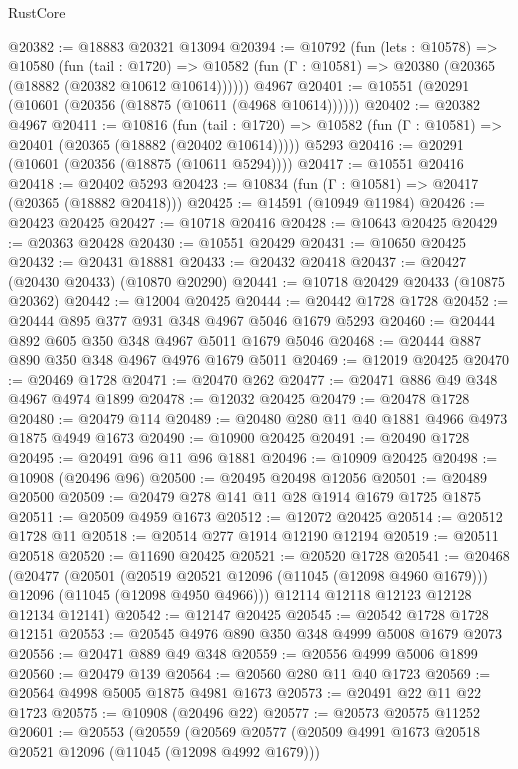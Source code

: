 \begin{lexlean}{RustCore}
\begin{coremodule}
@20382 := @18883 @20321 @13094
@20394 := @10792
    (fun (lets : @10578) =>
    @10580
      (fun (tail : @1720) =>
      @10582 (fun (Γ : @10581) => @20380 (@20365 (@18882 (@20382 @10612 @10614))))))
    @4967
@20401 := @10551 (@20291 (@10601 (@20356 (@18875 (@10611 (@4968 @10614))))))
@20402 := @20382 @4967
@20411 := @10816
    (fun (tail : @1720) => @10582 (fun (Γ : @10581) => @20401 (@20365 (@18882 (@20402 @10614)))))
    @5293
@20416 := @20291 (@10601 (@20356 (@18875 (@10611 @5294))))
@20417 := @10551 @20416
@20418 := @20402 @5293
@20423 := @10834 (fun (Γ : @10581) => @20417 (@20365 (@18882 @20418)))
@20425 := @14591 (@10949 @11984)
@20426 := @20423 @20425
@20427 := @10718 @20416
@20428 := @10643 @20425
@20429 := @20363 @20428
@20430 := @10551 @20429
@20431 := @10650 @20425
@20432 := @20431 @18881
@20433 := @20432 @20418
@20437 := @20427 (@20430 @20433) (@10870 @20290)
@20441 := @10718 @20429 @20433 (@10875 @20362)
@20442 := @12004 @20425
@20444 := @20442 @1728 @1728
@20452 := @20444 @895 @377 @931 @348 @4967 @5046 @1679 @5293
@20460 := @20444 @892 @605 @350 @348 @4967 @5011 @1679 @5046
@20468 := @20444 @887 @890 @350 @348 @4967 @4976 @1679 @5011
@20469 := @12019 @20425
@20470 := @20469 @1728
@20471 := @20470 @262
@20477 := @20471 @886 @49 @348 @4967 @4974 @1899
@20478 := @12032 @20425
@20479 := @20478 @1728
@20480 := @20479 @114
@20489 := @20480 @280 @11 @40 @1881 @4966 @4973 @1875 @4949 @1673
@20490 := @10900 @20425
@20491 := @20490 @1728
@20495 := @20491 @96 @11 @96 @1881
@20496 := @10909 @20425
@20498 := @10908 (@20496 @96)
@20500 := @20495 @20498 @12056
@20501 := @20489 @20500
@20509 := @20479 @278 @141 @11 @28 @1914 @1679 @1725 @1875
@20511 := @20509 @4959 @1673
@20512 := @12072 @20425
@20514 := @20512 @1728 @11
@20518 := @20514 @277 @1914 @12190 @12194
@20519 := @20511 @20518
@20520 := @11690 @20425
@20521 := @20520 @1728
@20541 := @20468
    (@20477
      (@20501
        (@20519 @20521 @12096 (@11045 (@12098 @4960 @1679)))
        @12096
        (@11045 (@12098 @4950 @4966)))
      @12114
      @12118
      @12123
      @12128
      @12134
      @12141)
@20542 := @12147 @20425
@20545 := @20542 @1728 @1728 @12151
@20553 := @20545 @4976 @890 @350 @348 @4999 @5008 @1679 @2073
@20556 := @20471 @889 @49 @348
@20559 := @20556 @4999 @5006 @1899
@20560 := @20479 @139
@20564 := @20560 @280 @11 @40 @1723
@20569 := @20564 @4998 @5005 @1875 @4981 @1673
@20573 := @20491 @22 @11 @22 @1723
@20575 := @10908 (@20496 @22)
@20577 := @20573 @20575 @11252
@20601 := @20553
    (@20559
      (@20569
        @20577
        (@20509 @4991 @1673 @20518 @20521 @12096 (@11045 (@12098 @4992 @1679)))

\end{coremodule}
\end{lexlean}
